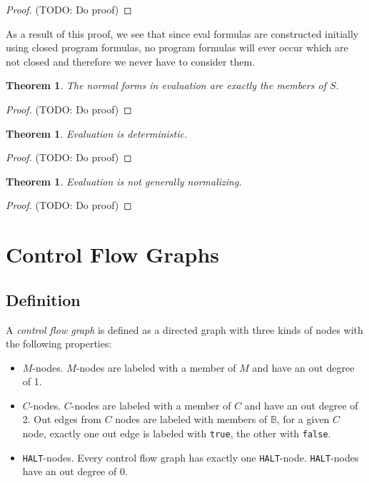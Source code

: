 \documentclass[11pt]{article}
\begin{document}
\begin{proof}
(TODO: Do proof)
\end{proof}

As a result of this proof, we see that since eval formulas are constructed initially using closed program formulas, no program formulas will ever occur which are not closed and therefore we never have to consider them.

\newtheorem*{evalnormalforms}{Theorem}
\begin{evalnormalforms}
The normal forms in evaluation are exactly the members of $S$.
\end{evalnormalforms}

\begin{proof}
(TODO: Do proof)
\end{proof}

\newtheorem*{evaldeterminism}{Theorem}
\begin{evaldeterminism}
Evaluation is deterministic.
\end{evaldeterminism}

\begin{proof}
(TODO: Do proof)
\end{proof}

\newtheorem*{evalnotnormalizing}{Theorem}
\begin{evalnotnormalizing}
Evaluation is not generally normalizing.
\end{evalnotnormalizing}

\begin{proof}
(TODO: Do proof)
\end{proof}

\section{Control Flow Graphs}

\subsection{Definition}

A \emph{control flow graph} is defined as a directed graph with three kinds of nodes with the following properties:

\begin{itemize}
\item $M$-nodes.  $M$-nodes are labeled with a member of $M$ and have an out degree of 1.
\item $C$-nodes.  $C$-nodes are labeled with a member of $C$ and have an out degree of 2.  Out edges from $C$ nodes are labeled with members of $\mathbb{B}$, for a given $C$ node, exactly one out edge is labeled with \texttt{true}, the other with \texttt{false}.
\item \texttt{HALT}-nodes.  Every control flow graph has exactly one \texttt{HALT}-node.  \texttt{HALT}-nodes have an out degree of 0.
\end{itemize}
\end{document}
